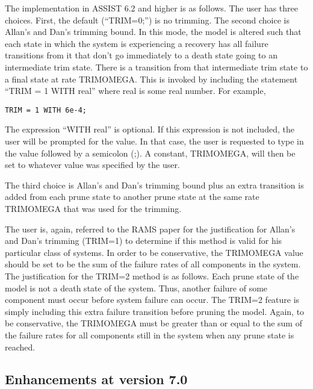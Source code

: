    The implementation in ASSIST 6.2 and higher is as follows.  The user has three
choices.  First, the default (``TRIM=0;'') is no trimming.  The second
choice is Allan's and Dan's trimming bound.  In this mode, the model is
altered such that each state in which the system is experiencing a recovery
has all failure transitions from it that don't go immediately to a death
state going to an intermediate trim state. 
There is a transition from that intermediate trim state to a final state
at rate TRIMOMEGA.  This is invoked by including the statement 
``TRIM = 1 WITH real'' where real is some real number.  For example,
\begin{verbatim}
TRIM = 1 WITH 6e-4;
\end{verbatim}
The expression ``WITH real'' is optional.  If this expression is not included,
the user will be prompted for the value.  In that case, the user is 
requested to type in the value followed by a semicolon (;).  A constant,
TRIMOMEGA, will then be set to whatever value was specified by the user.

     The third choice is Allan's and Dan's trimming bound plus an extra
transition is added from each prune state to another prune state at the
same rate TRIMOMEGA that was used for the trimming.

     The user is, again, referred to the RAMS paper for the justification 
for Allan's and Dan's trimming (TRIM=1) to determine if this
method is valid for his particular class of systems.  
In order to be conservative,
the TRIMOMEGA value should be set to be the sum of the failure rates of
all components in the system.  The justification for the TRIM=2 method
is as follows.  Each prune state of the model is not a death state of the
system.  Thus, another failure of some component must occur before system
failure can occur.  The TRIM=2 feature is simply including this extra
failure transition before pruning the model.  Again, to be conservative,
the TRIMOMEGA must be greater than or equal to the sum of the failure
rates for all components still in the system when any prune state is
reached.

\subsection{Enhancements at version 7.0}

